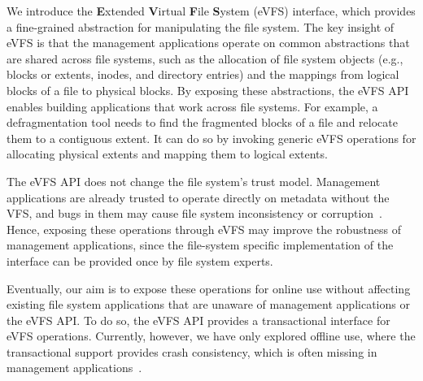We introduce the \textbf{E}xtended \textbf{V}irtual \textbf{F}ile \textbf{S}ystem (eVFS) interface, which provides a fine-grained abstraction for manipulating the file system. The key insight of eVFS is that the management applications operate on common abstractions that are shared across file systems, such as the allocation of file system objects (e.g., blocks or extents, inodes, and directory entries) and the mappings from logical blocks of a file to physical blocks. By exposing these abstractions, the eVFS API enables building applications that work across file systems. For example, a defragmentation tool needs to find the fragmented blocks of a file and relocate them to a contiguous extent. It can do so by invoking generic eVFS operations for allocating physical extents and mapping them to logical extents.

The eVFS API does not change the file system's trust model. Management applications are already trusted to operate directly on metadata without the VFS, and bugs in them may cause file system inconsistency or corruption~\cite{Carreira2012,Gunawi08b}. Hence, exposing these operations through eVFS may improve the robustness of management applications, since the file-system specific implementation of the interface can be provided once by file system experts.

Eventually, our aim is to expose these operations for online use without affecting existing file system applications that are unaware of management applications or the eVFS API. To do so, the eVFS API provides a transactional interface for eVFS operations. Currently, however, we have only explored offline use, where the transactional support provides crash consistency, which is often missing in management applications~\cite{gatla2018fsck}.


